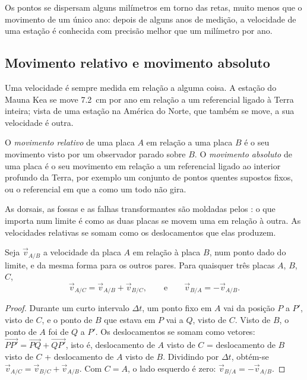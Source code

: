 Os pontos se dispersam alguns milímetros em torno das retas, muito menos que
o movimento de um único ano: depois de alguns anos de medição, a velocidade
de uma estação é conhecida com precisão melhor que um milímetro por ano.

\subsection{Movimento relativo e movimento absoluto}

Uma velocidade é sempre medida em relação a alguma coisa. A estação do Mauna
Kea se move \qty{7.2}{cm} por ano em relação a um referencial ligado à Terra
inteira; vista de uma estação na América do Norte, que também se move, a sua
velocidade é outra.

\begin{definition}\label{def:g11:plate-motions:relative-motion}
O \emph{movimento relativo} de uma placa $A$ em
relação a uma placa $B$ é o seu movimento visto por um observador parado
sobre $B$. O \emph{movimento absoluto} de uma
placa é o seu movimento em relação a um referencial ligado ao interior
profundo da Terra, por exemplo um conjunto de pontos quentes supostos fixos,
ou o referencial em que a  como um todo não gira.
\end{definition}

As dorsais, as fossas e as falhas transformantes são moldadas pelos
: o que importa num limite é como as duas placas se
movem uma em relação à outra. As velocidades relativas se somam como os
deslocamentos que elas produzem.

\begin{proposition}\label{prop:g11:plate-motions:sum}
Seja $\vec v_{A/B}$ a velocidade da placa $A$ em relação à placa $B$, num
ponto dado do limite, e da mesma forma para os outros pares. Para quaisquer
três placas $A$, $B$, $C$,
\[
  \vec v_{A/C} = \vec v_{A/B} + \vec v_{B/C},
  \qquad\text{e}\qquad
  \vec v_{B/A} = -\vec v_{A/B}.
\]
\end{proposition}

\begin{proof}
Durante um curto intervalo $\Delta t$, um ponto fixo em $A$ vai da posição $P$
a $P'$, visto de $C$, e o ponto de $B$ que estava em $P$ vai a
$Q$, visto de $C$. Visto de $B$, o ponto de $A$ foi de $Q$ a
$P'$. Os deslocamentos se somam como vetores:
$\overrightarrow{PP'} = \overrightarrow{PQ} + \overrightarrow{QP'}$, isto é,
deslocamento de $A$ visto de $C$ = deslocamento de $B$ visto de $C$ +
deslocamento de $A$ visto de $B$. Dividindo por $\Delta t$, obtém-se $\vec v_{A/C}
= \vec v_{B/C} + \vec v_{A/B}$. Com $C = A$, o lado esquerdo é zero: $\vec
v_{B/A} = -\vec v_{A/B}$.
\end{proof}

